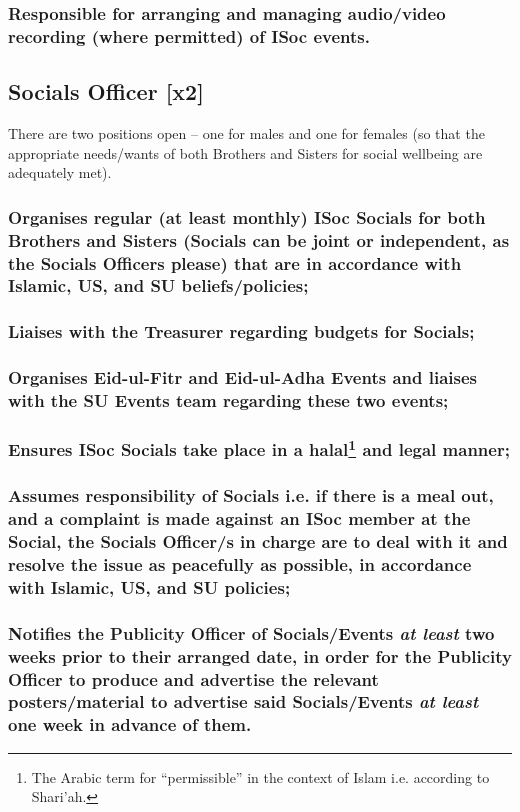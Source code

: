\documentclass[12pt]{article}
\begin{document}
\subsubsection{Responsible for arranging and managing audio/video recording (where permitted) of ISoc events.}
\hspace{1pt}

\subsection{Socials Officer [x2]}
There are two positions open -- one for males and one for females (so that the appropriate needs/wants of both Brothers and Sisters for social wellbeing are adequately met).
\subsubsection{Organises regular (at least monthly) ISoc Socials for both Brothers and Sisters (Socials can be joint or independent, as the Socials Officers please) that are in accordance with Islamic, US, and SU beliefs/policies;}
\subsubsection{Liaises with the Treasurer regarding budgets for Socials;}
\subsubsection{Organises Eid-ul-Fitr and Eid-ul-Adha Events and liaises with the SU Events team regarding these two events;}
\subsubsection{Ensures ISoc Socials take place in a halal\protect\footnote{The Arabic term for ``permissible'' in the context of Islam i.e. according to Shari'ah.} and legal manner;}
\subsubsection{Assumes responsibility of Socials i.e. if there is a meal out, and a complaint is made against an ISoc member at the Social, the Socials Officer/s in charge are to deal with it and resolve the issue as peacefully as possible, in accordance with Islamic, US, and SU policies;}
\subsubsection{Notifies the Publicity Officer of Socials/Events \emph{at least} two weeks prior to their arranged date, in order for the Publicity Officer to produce and advertise the relevant posters/material to advertise said Socials/Events \emph{at least} one week in advance of them.}
\hspace{1pt}
\end{document}
